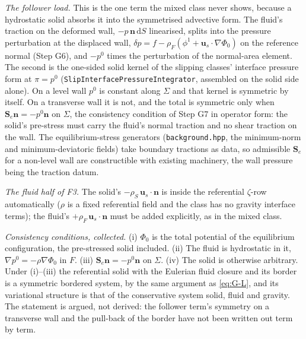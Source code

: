 \documentclass[11pt]{article}
\newcommand{\bu}{\mathbf{u}}
\newcommand{\bn}{\mathbf{n}}
\newcommand{\dS}{\,\mathrm{d}S}
\newcommand{\code}[1]{\texttt{#1}}
\begin{document}
\emph{The follower load.} This is the one term the mixed class never
shows, because a hydrostatic solid absorbs it into the symmetrised
advective form. The fluid's traction on the deformed wall, $-p\,\bn\dS$
linearised, splits into the pressure perturbation at the displaced
wall, $\delta p = f - \rho_F(\phi^1 + \bu_s\cdot\nabla\Phi_0)$ on the
reference normal (Step G6), and $-p^0$ times the perturbation of the
normal-area element. The second is the one-sided solid kernel of the
slipping classes' interface pressure form at $\pi = p^0$
(\code{SlipInterfacePressureIntegrator}, assembled on the solid side
alone). On a level wall $p^0$ is constant along $\Sigma$ and that kernel
is symmetric by itself. On a transverse wall it is not, and the total is
symmetric only when $\mathbf S_e\bn = -p^0\bn$ on $\Sigma$, the
consistency condition of Step G7 in operator form: the solid's
pre-stress must carry the fluid's normal traction and no shear traction
on the wall. The equilibrium-stress generators (\code{background.hpp},
the minimum-norm and minimum-deviatoric fields) take boundary tractions
as data, so admissible $\mathbf S_e$ for a non-level wall are
constructible with existing machinery, the wall pressure being the
traction datum.

\emph{The fluid half of F3.} The solid's $-\rho_S\,\bu_s\cdot\bn$ is
inside the referential $\zeta$-row automatically ($\rho$ is a fixed
referential field and the class has no gravity interface terms); the
fluid's $+\rho_F\,\bu_s\cdot\bn$ must be added explicitly, as in the
mixed class.

\emph{Consistency conditions, collected.} (i) $\Phi_0$ is the total
potential of the equilibrium configuration, the pre-stressed solid
included. (ii) The fluid is hydrostatic in it, $\nabla p^0 =
-\rho\nabla\Phi_0$ in $F$. (iii) $\mathbf S_e\bn = -p^0\bn$ on $\Sigma$.
(iv) The solid is otherwise arbitrary. Under (i)--(iii) the referential
solid with the Eulerian fluid closure and its border is a symmetric
bordered system, by the same argument as \eqref{eq:G-L}, and its
variational structure is that of the conservative system solid, fluid
and gravity. The statement is argued, not derived: the follower term's
symmetry on a transverse wall and the pull-back of the border have not
been written out term by term.
\end{document}
